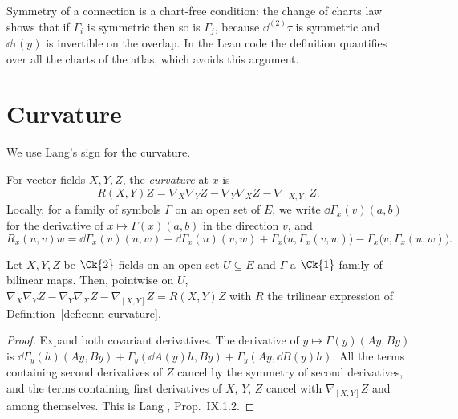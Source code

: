 \begin{remark}
  Symmetry of a connection is a chart-free condition: the change of charts law shows that if
  $\Gamma_i$ is symmetric then so is $\Gamma_j$, because $\dd^{(2)}\tau$ is symmetric and
  $\dd\tau(y)$ is invertible on the overlap. In the Lean code the definition quantifies over all
  the charts of the atlas, which avoids this argument.
\end{remark}

\section{Curvature}

We use Lang's sign for the curvature.

\begin{definition}[Curvature]
  \label{def:conn-curvature}
  \leanok
  For vector fields $X, Y, Z$, the \emph{curvature} at $x$ is
  \[
    R(X, Y) Z = \nabla_X \nabla_Y Z - \nabla_Y \nabla_X Z - \nabla_{[X, Y]} Z .
  \]
  Locally, for a family of symbols $\Gamma$ on an open set of $E$, we write
  $\dd\Gamma_x(v)(a, b)$ for the derivative of $x \mapsto \Gamma(x)(a, b)$ in the direction $v$,
  and
  \[
    R_x(u, v) w = \dd\Gamma_x(v)(u, w) - \dd\Gamma_x(u)(v, w)
      + \Gamma_x\bigl(u, \Gamma_x(v, w)\bigr) - \Gamma_x\bigl(v, \Gamma_x(u, w)\bigr).
  \]
\end{definition}

\begin{lemma}
  \label{lem:conn-local-curv}
  \leanok
  Let $X, Y, Z$ be $\Ck{2}$ fields on an open set $U \subseteq E$ and $\Gamma$ a $\Ck{1}$ family of
  bilinear maps. Then, pointwise on $U$,
  $\nabla_X \nabla_Y Z - \nabla_Y \nabla_X Z - \nabla_{[X, Y]} Z = R(X, Y) Z$
  with $R$ the trilinear expression of Definition~\ref{def:conn-curvature}.
\end{lemma}

\begin{proof}
  \leanok
  Expand both covariant derivatives. The derivative of $y \mapsto \Gamma(y)(A y, B y)$ is
  $\dd\Gamma_y(h)(A y, B y) + \Gamma_y(\dd A(y) h, B y) + \Gamma_y(A y, \dd B(y) h)$. All the
  terms containing second derivatives of $Z$ cancel by the symmetry of second derivatives, and
  the terms containing first derivatives of $X$, $Y$, $Z$ cancel with $\nabla_{[X,Y]} Z$ and
  among themselves. This is Lang \cite{Lan99}, Prop.~IX.1.2.
\end{proof}

